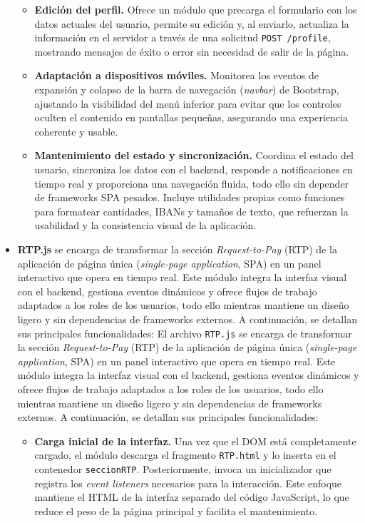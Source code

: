\begin{itemize}
\begin{itemize}
            \item \textbf{Edición del perfil.} Ofrece un módulo que precarga el formulario con los datos actuales del usuario, permite su edición y, al enviarlo, actualiza la información en el servidor a través de una solicitud \texttt{POST /profile}, mostrando mensajes de éxito o error sin necesidad de salir de la página.

            \item \textbf{Adaptación a dispositivos móviles.} Monitorea los eventos de expansión y colapso de la barra de navegación (\textit{navbar}) de Bootstrap, ajustando la visibilidad del menú inferior para evitar que los controles oculten el contenido en pantallas pequeñas, asegurando una experiencia coherente y usable.

            \item \textbf{Mantenimiento del estado y sincronización.} Coordina el estado del usuario, sincroniza los datos con el backend, responde a notificaciones en tiempo real y proporciona una navegación fluida, todo ello sin depender de frameworks SPA pesados. Incluye utilidades propias como funciones para formatear cantidades, IBANs y tamaños de texto, que refuerzan la usabilidad y la consistencia visual de la aplicación.
        \end{itemize}

    \item \textbf{RTP.js} se encarga de transformar la sección \textit{Request-to-Pay} (RTP) de la aplicación de página única (\textit{single-page application}, SPA) en un panel interactivo que opera en tiempo real. Este módulo integra la interfaz visual con el backend, gestiona eventos dinámicos y ofrece flujos de trabajo adaptados a los roles de los usuarios, todo ello mientras mantiene un diseño ligero y sin dependencias de frameworks externos. A continuación, se detallan sus principales funcionalidades:
        El archivo \texttt{RTP.js} se encarga de transformar la sección \textit{Request-to-Pay} (RTP) de la aplicación de página única (\textit{single-page application}, SPA) en un panel interactivo que opera en tiempo real. Este módulo integra la interfaz visual con el backend, gestiona eventos dinámicos y ofrece flujos de trabajo adaptados a los roles de los usuarios, todo ello mientras mantiene un diseño ligero y sin dependencias de frameworks externos. A continuación, se detallan sus principales funcionalidades:

        \begin{itemize}
            \item \textbf{Carga inicial de la interfaz.} Una vez que el DOM está completamente cargado, el módulo descarga el fragmento \texttt{RTP.html} y lo inserta en el contenedor \texttt{seccionRTP}. Posteriormente, invoca un inicializador que registra los \textit{event listeners} necesarios para la interacción. Este enfoque mantiene el HTML de la interfaz separado del código JavaScript, lo que reduce el peso de la página principal y facilita el mantenimiento.


\end{itemize}
\end{itemize}
